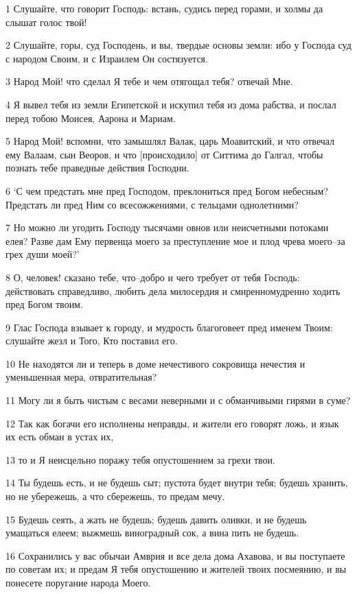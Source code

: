 \par 1 Слушайте, что говорит Господь: встань, судись перед горами, и холмы да слышат голос твой!
\par 2 Слушайте, горы, суд Господень, и вы, твердые основы земли: ибо у Господа суд с народом Своим, и с Израилем Он состязуется.
\par 3 Народ Мой! что сделал Я тебе и чем отягощал тебя? отвечай Мне.
\par 4 Я вывел тебя из земли Египетской и искупил тебя из дома рабства, и послал перед тобою Моисея, Аарона и Мариам.
\par 5 Народ Мой! вспомни, что замышлял Валак, царь Моавитский, и что отвечал ему Валаам, сын Веоров, и что [происходило] от Ситтима до Галгал, чтобы познать тебе праведные действия Господни.
\par 6 `С чем предстать мне пред Господом, преклониться пред Богом небесным? Предстать ли пред Ним со всесожжениями, с тельцами однолетними?
\par 7 Но можно ли угодить Господу тысячами овнов или неисчетными потоками елея? Разве дам Ему первенца моего за преступление мое и плод чрева моего--за грех души моей?'
\par 8 О, человек! сказано тебе, что--добро и чего требует от тебя Господь: действовать справедливо, любить дела милосердия и смиренномудренно ходить пред Богом твоим.
\par 9 Глас Господа взывает к городу, и мудрость благоговеет пред именем Твоим: слушайте жезл и Того, Кто поставил его.
\par 10 Не находятся ли и теперь в доме нечестивого сокровища нечестия и уменьшенная мера, отвратительная?
\par 11 Могу ли я быть чистым с весами неверными и с обманчивыми гирями в суме?
\par 12 Так как богачи его исполнены неправды, и жители его говорят ложь, и язык их есть обман в устах их,
\par 13 то и Я неисцельно поражу тебя опустошением за грехи твои.
\par 14 Ты будешь есть, и не будешь сыт; пустота будет внутри тебя; будешь хранить, но не убережешь, а что сбережешь, то предам мечу.
\par 15 Будешь сеять, а жать не будешь; будешь давить оливки, и не будешь умащаться елеем; выжмешь виноградный сок, а вина пить не будешь.
\par 16 Сохранились у вас обычаи Амврия и все дела дома Ахавова, и вы поступаете по советам их; и предам Я тебя опустошению и жителей твоих посмеянию, и вы понесете поругание народа Моего.

